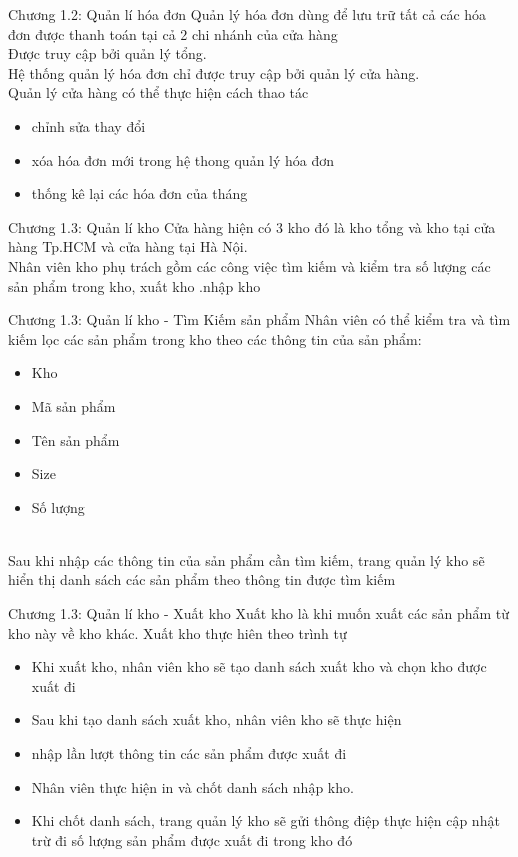 \documentclass{beamer}
\begin{document}
\begin{frame}{Chương 1.2: Quản lí hóa đơn}
    Quản lý hóa đơn dùng để lưu trữ tất cả các hóa đơn được thanh toán tại cả 2 chi nhánh của cửa hàng  \\
    Được truy cập bởi quản lý tổng. \\
    Hệ thống quản lý hóa đơn chỉ được truy cập bởi quản lý cửa hàng.\\
    Quản lý cửa hàng có thể thực hiện cách thao tác
        \begin{itemize}
            \item chỉnh sửa thay đổi
            \item xóa hóa đơn mới trong hệ thong quản lý hóa đơn
            \item thống kê lại các hóa đơn của tháng
        \end{itemize}
\end{frame}
\begin{frame}{Chương 1.3: Quản lí kho}
    Cửa hàng hiện có 3 kho đó là kho tổng và kho tại cửa hàng Tp.HCM và cửa hàng tại Hà Nội.\\
    
    Nhân viên kho phụ trách gồm các công việc tìm kiếm và kiểm tra số lượng các sản phẩm trong kho, xuất kho .nhập kho\\
\end{frame}
\begin{frame}{Chương 1.3: Quản lí kho - Tìm Kiếm sản phẩm}
    Nhân viên có thể kiểm tra và tìm kiếm lọc các sản phẩm trong kho theo các thông tin của sản phẩm:

    \begin{itemize}
        \item Kho
        \item Mã sản phẩm
        \item Tên sản phẩm
        \item Size
        \item Số lượng 
    \end{itemize}\\
    Sau khi nhập các thông tin của sản phẩm cần tìm kiếm, trang quản lý kho sẽ hiển thị danh sách các sản phẩm theo thông tin được tìm kiếm
\end{frame}
\begin{frame}{Chương 1.3: Quản lí kho - Xuất kho}
   Xuất kho là khi muốn xuất các sản phẩm từ kho này về kho khác. Xuất kho thực hiên theo trình tự
   \begin{itemize}
    
        \item Khi xuất kho, nhân viên kho sẽ tạo danh sách xuất kho và chọn kho được xuất đi
        \item Sau khi tạo danh sách xuất kho, nhân viên kho sẽ thực hiện 
        \item nhập lần lượt thông tin các sản phẩm được xuất đi
        \item Nhân viên thực hiện in và chốt danh sách nhập kho. 
        \item Khi chốt danh sách, trang quản lý kho sẽ gửi thông điệp thực hiện cập nhật trừ đi số lượng sản phẩm được xuất đi trong kho đó
   \end{itemize}
\end{frame}
\end{document}

